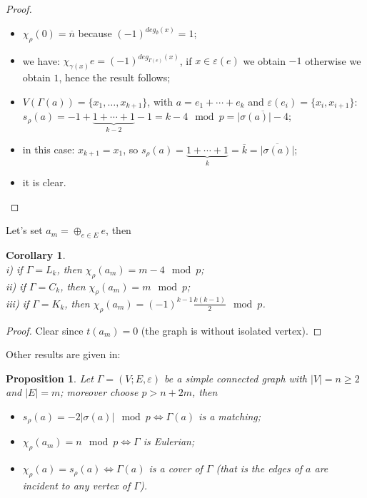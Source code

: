 \documentclass[preprint,12pt,authoryear]{elsarticle}
\newtheorem{cor}[thm]{Corollary}
\newtheorem{prop}[thm]{Proposition}
\theoremstyle{definition}
\begin{document}
\begin{proof}\textrm{}\\
 
 \begin{itemize}
\item[i)] $ \chi_{\rho}(0) =   \overline{n}  $ because  $(-1)^{deg_{\emptyset}(x)} =1$;
\item[ii)]we have: ${\displaystyle \chi_{\gamma(x)}e=(-1)^{deg_{\Gamma(e)}(x)}}$, if $x\in \varepsilon(e)$ we obtain $-1$ otherwise we obtain $1$, hence the result follows;
\item[iii)] ${\displaystyle  V(\Gamma(a))=\{x_1,\ldots, x_{k+1} \}}$, with ${\displaystyle  a=e_1 +\cdots +e_k}$ and 
$ \varepsilon(e_i)=\{x_i, x_{i+1} \} $:\\
$ s_{\rho}(a)=-1 +\underbrace{1+ \cdots +1}_{k-2} -1= k-4  \mod p = \overline{|\sigma(a)| -4}$;
\item[iv)] in this case:  $  x_{k+1}=x_1$, so $  s_{\rho}(a)=\underbrace{1+ \cdots +1}_{k}=\overline{k}=\overline{|\sigma(a)|}$;
\item[v)] it is   clear.\qedhere
\end{itemize}
\end{proof}


Let's set $a_m=\oplus_{e \in E}e$, then 


\begin{cor}\textrm{}\\
i) if $\Gamma= L_k$, then $\chi_{\rho}(a_m)= m-4  \mod p$;\\
ii) if $\Gamma= C_k$, then $\chi_{\rho} (a_m)=m \mod p $;\\
iii) if $\Gamma=K_k$, then $\chi_{\rho}(a_m)= (-1)^{k-1} \frac{k(k-1)}{2} \mod p$.
\end{cor}

\begin{proof} Clear since $t(a_m)=0$ (the graph is without isolated vertex).
\end{proof}
\noindent Other results are given in:

\begin{prop}\textrm{}
 Let $\Gamma=(V;E,\varepsilon)$ be a simple connected graph with $|V|=n \ge 2$ and $|E|=m$;  moreover choose $p >n+2m$, then
\begin{itemize}
\item[i)]  $s_{\rho}(a)=-2 |\sigma(a)| \mod p \Longleftrightarrow \Gamma(a)$ is a matching;
\item[ii)]  $\chi_{\rho}(a_m)=n  \mod p \Longleftrightarrow \Gamma$ is Eulerian;
\item[iii]  $\chi_{\rho}(a)=s_{\rho}(a)  \Longleftrightarrow \Gamma(a)$ is a cover of $\Gamma$ (that is 
the edges of $a$ are  incident to any vertex of  $\Gamma$).
\end{itemize}
\end{prop}
\end{document}
